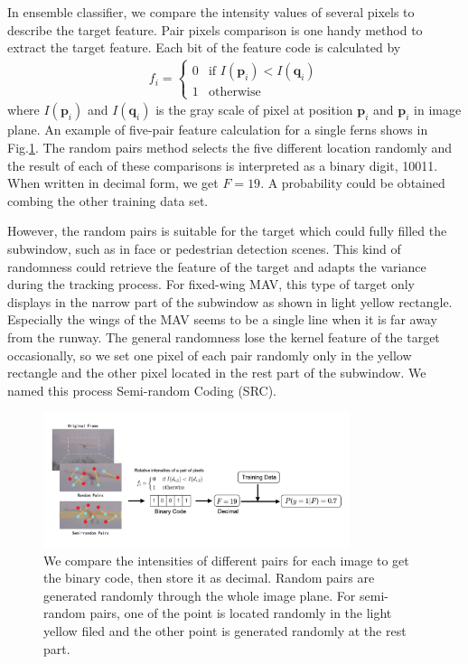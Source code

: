 In ensemble classifier, we compare the intensity values of several pixels to describe the target feature. Pair pixels comparison is one handy method to extract the target feature. Each bit of the feature code is calculated by
\begin{align}
f_i=\left\{ \begin{array}{ll}
0 &\mbox{if $I(\mathbf{p}_i) < I(\mathbf{q}_i)$} \\
1 &\mbox{otherwise} \end{array} \right.
\end{align}
where $I(\mathbf{p}_i)$ and $I(\mathbf{q}_i)$ is the gray scale of pixel at position $\mathbf{p}_i$  and $\mathbf{p}_i$ in image plane. An example of five-pair feature calculation for a single ferns shows in Fig.\ref{fig:01_TLD_Code}. The random pairs method selects the five different location randomly and the result of each of these comparisons is interpreted as a binary digit, 10011. When written in decimal form, we get $F=19$. A probability could be obtained combing the other training data set.

However, the random pairs is suitable for the target which could fully filled the subwindow, such as in face or pedestrian detection scenes. This kind of randomness could retrieve the feature of the target and adapts the variance during the tracking process. For fixed-wing MAV, this type of target only displays in the narrow part of the subwindow as shown in light yellow rectangle. Especially the wings of the MAV seems to be a single line when it is far away from the runway. The general randomness lose the kernel feature of the target occasionally, so we set one pixel of each pair randomly only in the yellow rectangle and the other pixel located in the rest part of the subwindow.  We named this process Semi-random Coding (SRC). 

\begin{figure}[!th]
	\centering
	\includegraphics[width=0.8\textwidth]{Figs/01_TLD_Code.pdf}
	\caption{We compare the intensities of different pairs for each image to get the binary code, then store it as decimal. Random pairs are generated randomly through the whole image plane. For semi-random pairs, one of the point is located randomly in the light yellow ﬁled and the other point is generated randomly at the rest part.}
	\label{fig:01_TLD_Code}    
\end{figure}

